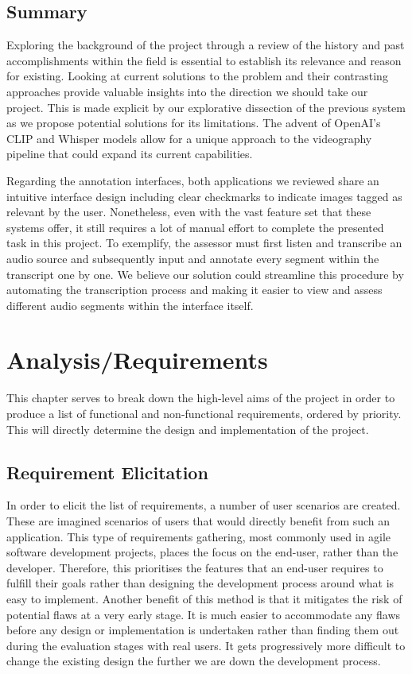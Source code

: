 \documentclass{l4proj}
\begin{document}
\section{Summary}
Exploring the background of the project through a review of the history and past accomplishments within the field is essential to establish its relevance and reason for existing. Looking at current solutions to the problem and their contrasting approaches provide valuable insights into the direction we should take our project. This is made explicit by our explorative dissection of the previous system as we propose potential solutions for its limitations. The advent of OpenAI's CLIP and Whisper \citep{whisper} models allow for a unique approach to the videography pipeline that could expand its current capabilities.

Regarding the annotation interfaces, both applications we reviewed share an intuitive interface design including clear checkmarks to indicate images tagged as relevant by the user. Nonetheless, even with the vast feature set that these systems offer, it still requires a lot of manual effort to complete the presented task in this project. To exemplify, the assessor must first listen and transcribe an audio source and subsequently input and annotate every segment within the transcript one by one. We believe our solution could streamline this procedure by automating the transcription process and making it easier to view and assess different audio segments within the interface itself.


\chapter{Analysis/Requirements}
\label{chap:requirements}
This chapter serves to break down the high-level aims of the project in order to produce a list of functional and non-functional requirements, ordered by priority. This will directly determine the design and implementation of the project.

\section{Requirement Elicitation}
In order to elicit the list of requirements, a number of user scenarios are created. These are imagined scenarios of users that would directly benefit from such an application. This type of requirements gathering, most commonly used in agile software development projects, places the focus on the end-user, rather than the developer. Therefore, this prioritises the features that an end-user requires to fulfill their goals rather than designing the development process around what is easy to implement. Another benefit of this method is that it mitigates the risk of potential flaws at a very early stage. It is much easier to accommodate any flaws before any design or implementation is undertaken rather than finding them out during the evaluation stages with real users. It gets progressively more difficult to change the existing design the further we are down the development process.
\end{document}
